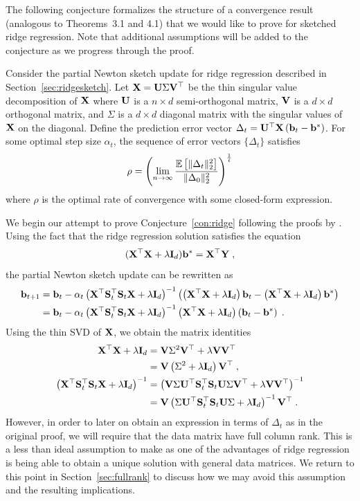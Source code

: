The following conjecture formalizes the structure of a convergence result (analogous to Theorems~3.1 and 4.1) that we would like to prove for sketched ridge regression. Note that additional assumptions will be added to the conjecture as we progress through the proof.

\begin{conjecture} \label{con:ridge}
Consider the partial Newton sketch update for ridge regression described in Section~\ref{sec:ridgesketch}. Let $\mathbf{X} = \mathbf{U}\Sigma\mathbf{V}^\top$ be the thin singular value decomposition of $\mathbf{X}$ where $\mathbf{U}$ is a $n\times d$ semi-orthogonal matrix, $\mathbf{V}$ is a $d\times d$ orthogonal matrix, and $\Sigma$ is a $d\times d$ diagonal matrix with the singular values of $\mathbf{X}$ on the diagonal. Define the prediction error vector $\Delta_t=\mathbf{U}^\top\mathbf{X}\left(\mathbf{b}_t-\mathbf{b}^*\right)$. For some optimal step size $\alpha_t$, the sequence of error vectors $\{\Delta_t\}$ satisfies
\[
\rho = \left(\lim_{n\rightarrow\infty}\frac{\mathbb{E}\left[\|\Delta_t\|_2^2\right]}{\|\Delta_0\|_2^2}\right)^\frac{1}{t}
\]
where $\rho$ is the optimal rate of convergence with some closed-form expression.
\end{conjecture}

We begin our attempt to prove Conjecture~\ref{con:ridge} following the proofs by \citet{Lacotte:2020}. Using the fact that the ridge regression solution satisfies the equation
\[
(\mathbf{X}^\top\mathbf{X} + \lambda\mathbf{I}_d)\mathbf{b}^* = \mathbf{X}^\top\mathbf{Y} \;,
\]
the partial Newton sketch update can be rewritten as
\begin{align*}
\mathbf{b}_{t+1} &= \mathbf{b}_t - \alpha_t\left(\mathbf{X}^\top\mathbf{S}_t^\top\mathbf{S}_t\mathbf{X} + \lambda\mathbf{I}_d\right)^{-1}\left(\left(\mathbf{X}^\top\mathbf{X}+\lambda\mathbf{I}_d\right)\mathbf{b}_t-\left(\mathbf{X}^\top\mathbf{X}+\lambda\mathbf{I}_d\right)\mathbf{b}^*\right) \\
&= \mathbf{b}_t - \alpha_t\left(\mathbf{X}^\top\mathbf{S}_t^\top\mathbf{S}_t\mathbf{X} + \lambda\mathbf{I}_d\right)^{-1}\left(\mathbf{X}^\top\mathbf{X}+\lambda\mathbf{I}_d\right)\left(\mathbf{b}_t-\mathbf{b}^*\right) \;.
\end{align*}
Using the thin SVD of $\mathbf{X}$, we obtain the matrix identities
\begin{align*}
\mathbf{X}^\top\mathbf{X}+\lambda\mathbf{I}_d &= \mathbf{V}\Sigma^2\mathbf{V}^\top + \lambda \mathbf{V}\mathbf{V}^\top \\
&= \mathbf{V}\left(\Sigma^2+ \lambda\mathbf{I}_d\right)\mathbf{V}^\top \;, \\
\left(\mathbf{X}^\top\mathbf{S}_t^\top\mathbf{S}_t\mathbf{X} + \lambda\mathbf{I}_d\right)^{-1} &= \left(\mathbf{V}\Sigma\mathbf{U}^\top\mathbf{S}_t^\top\mathbf{S}_t\mathbf{U}\Sigma\mathbf{V}^\top + \lambda\mathbf{V}\mathbf{V}^\top\right)^{-1} \\
&= \mathbf{V}\left(\Sigma\mathbf{U}^\top\mathbf{S}_t^\top\mathbf{S}_t\mathbf{U}\Sigma + \lambda\mathbf{I}_d\right)^{-1}\mathbf{V}^\top \;.
\end{align*}
However, in order to later on obtain an expression in terms of $\Delta_t$ as in the original proof, we will require that the data matrix have full column rank. This is a less than ideal assumption to make as one of the advantages of ridge regression is being able to obtain a unique solution with general data matrices. We return to this point in Section~\ref{sec:fullrank} to discuss how we may avoid this assumption and the resulting implications.


